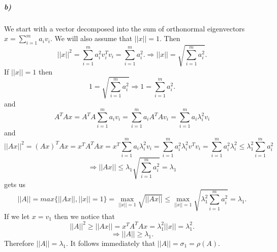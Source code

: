 \documentclass[12pt]{article}
\begin{document}
	
	\subparagraph{b)}
		We start with a vector decomposed into the sum of orthonormal eigenvectors $x = \sum_{i=1}^{m} a_iv_i$. We will also assume that $||x|| = 1$. Then
		\[
		||x||^2 = \sum_{i=1}^{m} a_i^2 v_i^Tv_i = \sum_{i=1}^{m} a_i^2.
		\Rightarrow ||x|| = \sqrt{\sum_{i=1}^{m} a_i^2}.
		\]
		If $||x|| = 1$ then
		\[
		1 = \sqrt{\sum_{i=1}^{m} a_i^2} \Rightarrow 1 = \sum_{i=1}^{m} a_i^2.
		\]
		and
		\[
		A^TAx = A^TA\sum_{i=1}^{m} a_iv_i = \sum_{i=1}^{m} a_iA^TAv_i = \sum_{i=1}^{m} a_i\lambda_i^2v_i
		\]
		and
		\[
		||Ax||^2 = (Ax)^TAx = x^TA^TAx = x^T\sum_{i=1}^{m} a_i\lambda_i^2v_i = 
		\sum_{i=1}^{m} a_i^2\lambda_i^2 v^Tv_i = \sum_{i=1}^{m} a_i^2\lambda_i^2
		\le \lambda_1^2 \sum_{i=1}^{m} a_i^2
		\]\[
		\Rightarrow ||Ax|| \le \lambda_1 \sqrt{\sum_{i=1}^{m} a_i^2} = \lambda_1
		\]
		gets us 
		\[
		||A|| = max\{||Ax||, ||x|| = 1\} = \max\limits_{||x|| = 1} \sqrt{||Ax||}
		\le \max\limits_{||x|| = 1} \sqrt{\lambda_1^2\sum_{i=1}^{m} a_i^2} = \lambda_1.
		\]
		If we let $x = v_1$ then we notice that 
		\[
		||A||^2 \ge ||Ax|| = x^TA^TAx = \lambda_1^2 ||x|| = \lambda_1^2.
		\]\[
		\Rightarrow ||A|| \ge \lambda_1.
		\]
		Therefore $||A|| = \lambda_1$. It follows immediately that $||A|| = \sigma_1 = \rho(A)$.
		
	
	
	
	
	
	
	
	
	
	
	
	
	
	
	
	
	
	
	
	
	
	
	
	
	
	
	
	
	
	
	
	
	
	
	
	
	
	
	
	
	
	
\end{document}
